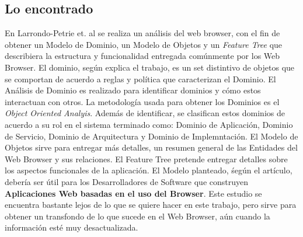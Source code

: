\subsection{Lo encontrado}
En Larrondo-Petrie et. al \cite{535061} se realiza un análisis del web browser, con el fin de obtener un Modelo de Dominio, un Modelo de Objetos y un \textit{Feature Tree} que describiera la estructura y funcionalidad entregada comúnmente por los Web Browser. El dominio, según explica el trabajo, es un set distintivo de objetos que se comportan de acuerdo a reglas y política que caracterizan el Dominio. El Análisis de Dominio es realizado para identificar dominios y cómo estos interactuan con otros. La metodología usada para obtener los Dominios es el \textit{Object Oriented Analyis}. Además de identificar, se clasifican estos dominios de acuerdo a su rol en el sistema terminado como: Dominio de Aplicación, Dominio de Servicio, Dominio de Arquitectura y Dominio de Implemntación. El Modelo de Objetos sirve para entregar más detalles, un resumen general de las Entidades del Web Browser y sus relaciones. El Feature Tree pretende entregar detalles sobre los aspectos funcionales de la aplicación. El Modelo planteado, śegún el artículo, debería ser útil para los Desarrolladores de Software que construyen \textbf{Aplicaciones Web basadas en el uso del Browser}.  Este estudio se encuentra bastante lejos de lo que se quiere hacer en este trabajo, pero sirve para obtener un transfondo de lo que sucede en el Web Browser, aún cuando la información esté muy desactualizada.


